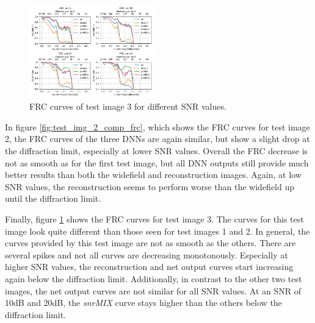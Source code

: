 \documentclass[conference]{IEEEtran}
\begin{document}
\begin{figure}[h]
    \centering
    \includegraphics[width=0.48\textwidth]{images/test_img_3_comp_frc.png}
    \caption{FRC curves of test image 3 for different SNR values.}
    \label{fig:test_img_3_comp_frc}
\end{figure}

In figure \ref{fig:test_img_2_comp_frc}, which shows the FRC curves for test image 2, the FRC curves of the three DNNs are again similar, but show a slight drop at the diffraction limit, especially at lower SNR values. Overall the FRC decrease is not as smooth as for the first test image, but all DNN outputs still provide much better results than both the widefield and reconstruction images. Again, at low SNR values, the reconstruction seems to perform worse than the widefield up until the diffraction limit.

Finally, figure \ref{fig:test_img_3_comp_frc} shows the FRC curves for test image 3. The curves for this test image look quite different than those seen for test images 1 and 2. In general, the curves provided by this test image are not as smooth as the others. There are several spikes and not all curves are decreasing monotonously. Especially at higher SNR values, the reconstruction and net output curves start increasing again below the diffraction limit. Additionally, in contrast to the other two test images, the net output curves are not similar for all SNR values. At an SNR of 10dB and 20dB, the \textit{snrMIX} curve stays higher than the others below the diffraction limit.
\end{document}
